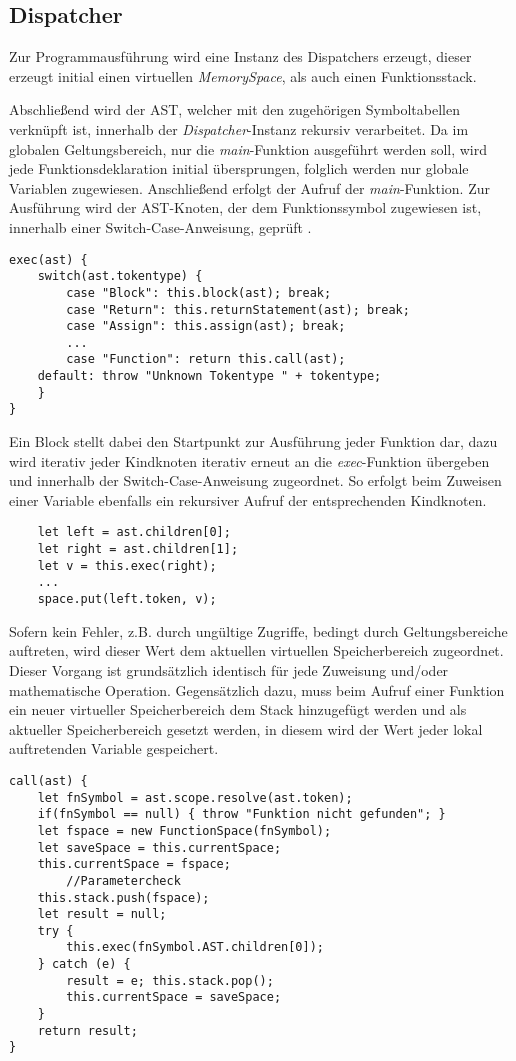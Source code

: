 \documentclass[]{lni}
\begin{document}
\subsection{Dispatcher}

Zur Programmausführung wird eine Instanz des Dispatchers erzeugt, dieser erzeugt initial einen virtuellen \textit{MemorySpace}, als auch einen Funktionsstack.

Abschließend wird der AST, welcher mit den zugehörigen Symboltabellen verknüpft ist, innerhalb der \textit{Dispatcher}-Instanz rekursiv verarbeitet. Da im globalen Geltungsbereich, nur die \textit{main}-Funktion ausgeführt werden soll, wird jede Funktionsdeklaration initial übersprungen, folglich werden nur globale Variablen zugewiesen. Anschließend erfolgt der Aufruf der \textit{main}-Funktion. Zur Ausführung wird der AST-Knoten, der dem Funktionssymbol zugewiesen ist, innerhalb einer Switch-Case-Anweisung, geprüft \cite{Parr2009}.
\begin{lstlisting}
exec(ast) {
	switch(ast.tokentype) {
		case "Block": this.block(ast); break;
		case "Return": this.returnStatement(ast); break;
		case "Assign": this.assign(ast); break;
		...
		case "Function": return this.call(ast);
	default: throw "Unknown Tokentype " + tokentype;
	}
}
\end{lstlisting}

Ein Block stellt dabei den Startpunkt zur Ausführung jeder Funktion dar, dazu wird iterativ jeder Kindknoten iterativ erneut an die \textit{exec}-Funktion übergeben und innerhalb der Switch-Case-Anweisung zugeordnet. So erfolgt beim Zuweisen einer Variable ebenfalls ein rekursiver Aufruf der entsprechenden Kindknoten. 
\begin{lstlisting}
	let left = ast.children[0];
	let right = ast.children[1];
	let v = this.exec(right);
	...
	space.put(left.token, v);
\end{lstlisting}

Sofern kein Fehler, z.B. durch ungültige Zugriffe, bedingt durch Geltungsbereiche auftreten, wird dieser Wert dem aktuellen virtuellen Speicherbereich zugeordnet. Dieser Vorgang ist grundsätzlich identisch für jede Zuweisung und/oder mathematische Operation. 
Gegensätzlich dazu, muss beim Aufruf einer Funktion ein neuer virtueller Speicherbereich dem Stack hinzugefügt werden und als aktueller Speicherbereich gesetzt werden, in diesem wird der Wert jeder lokal auftretenden Variable gespeichert.
\newpage
\begin{lstlisting}
call(ast) {
	let fnSymbol = ast.scope.resolve(ast.token);
	if(fnSymbol == null) { throw "Funktion nicht gefunden"; }
	let fspace = new FunctionSpace(fnSymbol);
	let saveSpace = this.currentSpace;
	this.currentSpace = fspace;	
		//Parametercheck	
	this.stack.push(fspace);
	let result = null;
	try {
		this.exec(fnSymbol.AST.children[0]);
	} catch (e) {
		result = e; this.stack.pop();
		this.currentSpace = saveSpace;
	}
	return result;
}
\end{lstlisting}
\end{document}
